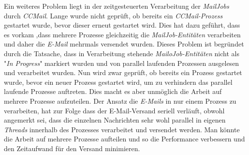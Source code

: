 \newline
\newline
Ein weiteres Problem liegt in der zeitgesteuerten Verarbeitung der \emph{MailJobs} durch \emph{CCMail}. Lange wurde nicht geprüft, ob bereits ein \emph{CCMail-Prozess} gestartet wurde, bevor dieser erneut gestartet wird. Dies hat dazu geführt, dass es vorkam ,dass mehrere Prozesse gleichzeitig die \emph{MailJob-Entitäten} verarbeiten und daher die \emph{E-Mail} mehrmals versendet wurden. Dieses Problem ist begründet durch die Tatsache, dass in Verarbeitung stehende \emph{MailoJob-Entitäten} nicht als "\emph{In Progress}" markiert wurden und von parallel laufenden Prozessen ausgelesen und verarbeitet wurden. Nun wird zwar geprüft, ob bereits ein Prozess gestartet wurde, bevor ein neuer Prozess gestartet wird, um zu verhindern das parallel laufende Prozesse auftreten. Dies macht es aber unmöglich die Arbeit auf mehrere Prozesse aufzuteilen. Der Ansatz die \emph{E-Mails} in nur einem Prozess zu verarbeiten, hat zur Folge dass der E-Mail-Versand seriell verläuft, obwohl angemerkt sei, dass die einzelnen Nachrichten sehr wohl parallel in eigenen \emph{Threads} innerhalb des Prozesses verarbeitet und versendet werden. Man könnte die Arbeit auf mehrere Prozesse aufteilen und so die Performance verbessern und den Zeitaufwand für den Versand minimieren.

